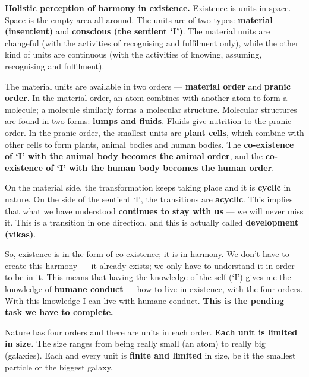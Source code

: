\textbf{Holistic perception of harmony in existence.} Existence is units in
space. Space is the empty area all around. The units are of two types:
\textbf{material (insentient)} and \textbf{conscious (the sentient `I')}. The
material units are changeful (with the activities of recognising and
fulfilment only), while the other kind of units are continuous (with the
activities of knowing, assuming, recognising and fulfilment).

The material units are available in two orders --- \textbf{material order} and
\textbf{pranic order}. In the material order, an atom combines with another
atom to form a molecule; a molecule similarly forms a molecular structure.
Molecular structures are found in two forms: \textbf{lumps and fluids}. Fluids
give nutrition to the pranic order. In the pranic order, the smallest units
are \textbf{plant cells}, which combine with other cells to form plants,
animal bodies and human bodies. The \textbf{co-existence of `I' with the
animal body becomes the animal order}, and the \textbf{co-existence of `I'
with the human body becomes the human order}.

On the material side, the transformation keeps taking place and it is
\textbf{cyclic} in nature. On the side of the sentient `I', the transitions are
\textbf{acyclic}. This implies that what we have understood \textbf{continues
to stay with us} --- we will never miss it. This is a transition in one
direction, and this is actually called \textbf{development (vikas)}.

So, existence is in the form of co-existence; it is in harmony. We don't have
to create this harmony --- it already exists; we only have to understand it in
order to be in it. This means that having the knowledge of the self (`I')
gives me the knowledge of \textbf{humane conduct} --- how to live in
existence, with the four orders. With this knowledge I can live with humane
conduct. \textbf{This is the pending task we have to complete.}

%
  {}

\ans Nature has four orders and there are units in each order. \textbf{Each
unit is limited in size.} The size ranges from being really small (an atom) to
really big (galaxies). Each and every unit is \textbf{finite and limited} in
size, be it the smallest particle or the biggest galaxy.

